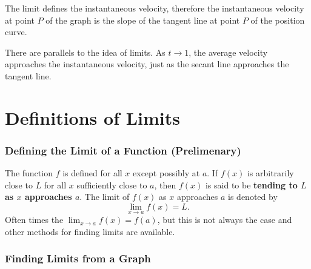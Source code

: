 \documentclass{report}
\begin{document}
The limit defines the instantaneous velocity, therefore the instantaneous velocity at point $P$ of the graph is the slope of the tangent line at point $P$ of the position curve.   

There are parallels to the idea of limits. As $t\to 1$, the average velocity approaches the instantaneous velocity, just as the secant line approaches the tangent line.

\newpage
\section{Definitions of Limits}
\subsubsection{Defining the Limit of a Function (Prelimenary)} 
The function $f$ is defined for all $x$ except possibly at $a$. If $f(x)$ is arbitrarily close to $L$ for all $x$ sufficiently close to $a$, then $f(x)$ is said to be \textbf{tending to $L$ as $x$ approaches $a$}. The limit of $f(x)$ as $x$ approaches $a$ is denoted by 
\begin{equation*}
    \lim_{x\to a}f(x)=L.
\end{equation*}
Often times the $\lim_{x\to a}f(x)=f(a)$, but this is not always the case and other methods for finding limits are available.

\subsubsection{Finding Limits from a Graph}

\end{document}
